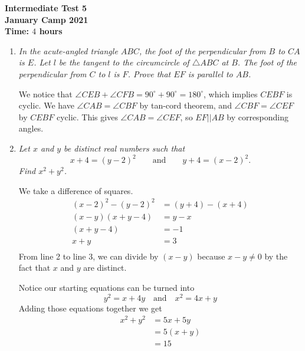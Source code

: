 \documentclass{article}
\begin{document}
\thispagestyle{empty}

\begin{center}
  \textbf{\Large Intermediate Test 5}
  \\ \vspace{1em}
  \textbf{\large January Camp 2021}
  \\ \vspace{1em}
  \textbf{\large Time: $4$ hours}
\end{center}

\vspace{12pt}

\begin{enumerate}[1.]

\item %
{\itshape In the acute-angled triangle $ABC$, the foot of the perpendicular from $B$ to $CA$ is $E$. Let $l$ be the tangent to the circumcircle of $\triangle ABC$ at $B$. The foot of the perpendicular from $C$ to $l$ is $F$. Prove that $EF$ is parallel to $AB$.}

We notice that $\angle CEB + \angle CFB = 90^\circ + 90^\circ = 180^\circ$, which implies $CEBF$ is cyclic. We have $\angle CAB = \angle CBF$ by tan-cord theorem, and $\angle CBF = \angle CEF$ by $CEBF$ cyclic. This gives $\angle CAB = \angle CEF$, so $EF||AB$ by corresponding angles.

\item %
{\itshape Let $x$ and $y$ be distinct real numbers such that $$x + 4 = (y - 2)^2 \qquad\text{and}\qquad y + 4 = (x - 2)^2.$$
Find $x^2 + y^2$.}

We take a difference of squares.
\begin{align*}
(x - 2)^2 - (y - 2)^2 &= (y + 4) - (x + 4)\\
(x - y)(x + y - 4) &= y - x\\
(x + y - 4) &= -1\\
x + y &= 3\\
\end{align*}
From line 2 to line 3, we can divide by $(x - y)$ because $x - y \neq 0$ by the fact that $x$ and $y$ are distinct.

Notice our starting equations can be turned into $$y^2 = x + 4y \quad \text{and}\quad x^2 = 4x + y$$ Adding those equations together we get
\begin{align*}
x^2 + y^2 &= 5x + 5y\\
&= 5(x + y)\\
&=15
\end{align*}


\end{enumerate}
\end{document}
